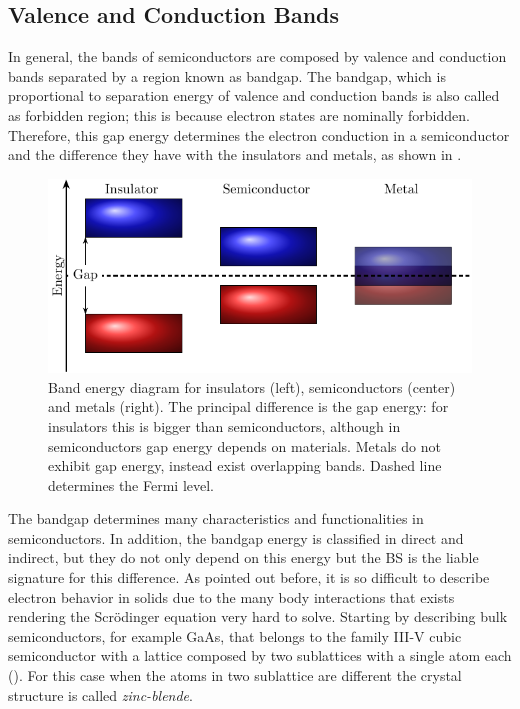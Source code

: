 \subsection{Valence and Conduction Bands}
\label{subsec:chapter-1-valence-and-conduction-bands}
\vspace{-10mm}
In general,  the bands of semiconductors are composed by valence and conduction bands separated by a  region known as bandgap. 
The bandgap, which is proportional to separation energy of valence and conduction bands is also called as forbidden region; this is because electron states are nominally forbidden. Therefore, this gap energy determines the electron conduction in a semiconductor and the difference they have with the insulators and metals, as shown in .  

\begin{figure}[h!]
	\centering
	\includegraphics[width=\linewidth]{../figures/chapter-1/solid-sort/build/solid-sort}
	\caption{
Band energy diagram for insulators (left), semiconductors (center) and metals (right). The principal difference is the gap energy: for insulators this is bigger than semiconductors, although in semiconductors gap energy depends on materials. Metals do not exhibit gap energy, instead exist overlapping bands. Dashed line determines the Fermi level.
	}
	\label{fig:subsubsection-1.1.1-solid-types}
\end{figure}

The bandgap determines many characteristics and functionalities in semiconductors. In addition, the bandgap energy is classified in direct and indirect, but they do not only depend on this energy but the \gls{BS} is the liable signature for this difference. As pointed out before, it is so difficult to describe electron behavior in solids due to the many body interactions that exists rendering the Scr\"odinger equation very hard to solve. 
Starting by describing bulk semiconductors, for example GaAs, that belongs to the  family III-V cubic semiconductor with a lattice composed by two sublattices with a single atom each (). For this case when the atoms in two sublattice are different the crystal structure is called \emph{zinc-blende}\cite{vurgaftman2020bands}.


